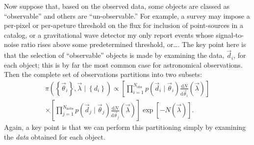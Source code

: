 \documentclass[modern]{aastex62}
\newcommand{\dd}{\mathrm{d}}
\newcommand{\diff}[2]{\frac{\dd #1}{\dd #2}}
\newcommand{\Nnobs}{N_\mathrm{nobs}}
\newcommand{\Nobs}{N_\mathrm{obs}}
\newcommand{\vd}{\vec{d}}
\newcommand{\vlambda}{\vec{\lambda}}
\newcommand{\vtheta}{\vec{\theta}}
\begin{document}
Now suppose that, based on the observed data, some objects are classed as
``observable'' and others are ``un-observable.''  For example, a survey may
impose a per-pixel or per-apeture threshold on the flux for inclusion of
point-sources in a catalog, or a gravitational wave detector my only report
events whose signal-to-noise ratio rises above some predetermined threshold,
or\ldots.  The key point here is that the selection of ``observable'' objects is
made by examining the data, $\vd_i$, for each object; this is by far the most
common case for astronomical observations.  Then the complete set of
observations partitions into two subsets:
%
\begin{multline}
  \pi\left(\left\{ \vtheta_i \right\}, \vlambda \mid \left\{ d_i \right\}\right) \propto \left[ \prod_{i=1}^{\Nobs} p\left( \vd_i \mid \vtheta_i \right) \diff{N}{\vtheta_i}\left( \vlambda \right) \right] \\ \times \left[ \prod_{j=1}^{\Nnobs} p\left( \vd_j \mid \vtheta_j \right) \diff{N}{\vtheta_j}\left( \vlambda \right) \right] \exp\left[ - N\left( \vlambda \right) \right].
\end{multline}
%
Again, a key point is that we can perform this partitioning simply by examining
the \emph{data} obtained for each object.
\end{document}
